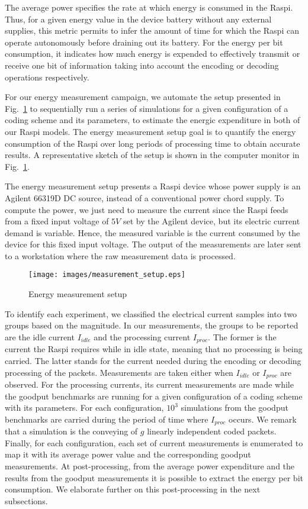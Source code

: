 The average power specifies the rate at which energy is
consumed in the \ac{Raspi}. Thus, for a given energy value in the device
battery without any external supplies, this metric permits to infer the amount
of time for which the \ac{Raspi} can operate autonomously before draining
out its battery. For the energy per bit consumption, it indicates how
much energy is expended to effectively transmit or receive one bit of
information taking into account the encoding or decoding operations
respectively.

For our energy measurement campaign, we automate the setup presented
in Fig.~\ref{fig:measurement_setup} to sequentially run a series of
simulations for a given configuration of a coding scheme and its parameters,
to estimate the energic expenditure in both of our \ac{Raspi}
models. The energy measurement setup goal is to quantify the energy
consumption of the \ac{Raspi} over long periods of processing time to
obtain accurate results. A representative sketch of the setup is shown
in the computer monitor in Fig.~\ref{fig:measurement_setup}.

The energy measurement setup presents a \ac{Raspi} device whose power
supply is an Agilent 66319D \ac{DC} source, instead of a conventional
power chord supply.   To compute the power, we just need to measure
the current since the \ac{Raspi} feeds from a fixed input voltage of $5V$
set by the Agilent device, but its electric current demand is variable.
Hence, the measured variable is the current consumed by the device for
this fixed input voltage. The output of the measurements
are later sent to a workstation where the raw measurement data is processed.

\begin{figure}[ht!]
\centering
\texttt{[image: images/measurement\_setup.eps]}
\caption{Energy measurement setup}
\label{fig:measurement_setup}
\end{figure}

To identify each experiment, we classified the electrical current samples
into two groups based on the magnitude. In our measurements, the groups to
be reported are the idle current $I_{idle}$ and the processing current
$I_{proc}$. The former is the current the \ac{Raspi} requires while in idle
state, meaning that no processing is being carried. The latter stands for
the current needed during the encoding or decoding processing of the packets.
Measurements are taken either when $I_{idle}$ or $I_{proc}$ are observed.
For the processing currents, its current measurements are made while the
goodput benchmarks are running for a given configuration of a coding scheme
with its parameters. For each configuration, $10^3$ simulations from the
goodput benchmarks are carried during the period of time where $I_{proc}$
occurs. We remark that a simulation is the conveying of $g$ linearly independent coded
packets. Finally, for each configuration, each set of current measurements is
enumerated to map it with its average power value and the corresponding goodput
measurements. At post-processing, from the average power expenditure and the
results from the goodput measurements it is possible to extract the energy
per bit consumption. We elaborate further on this post-processing in the
next subsections.

